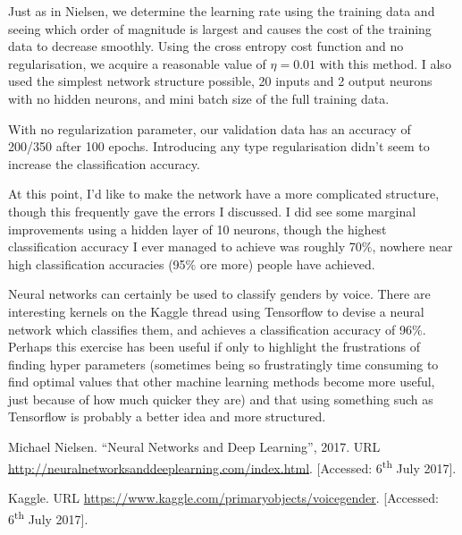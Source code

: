 \documentclass[10pt]{article}
\begin{document}
Just as in Nielsen, we determine the learning rate using the training data and seeing which order of magnitude is largest and causes the cost of the training data to decrease smoothly. Using the cross entropy cost function and no regularisation, we acquire a reasonable value of $\eta = 0.01$ with this method. I also used the simplest network structure possible, 20 inputs and 2 output neurons with no hidden neurons, and mini batch size of the full training data. \par
With no regularization parameter, our validation data has an accuracy of 200/350 after 100 epochs. Introducing any type regularisation didn't seem to increase the classification accuracy. \par
At this point, I'd like to make the network have a more complicated structure, though this frequently gave the errors I discussed. I did see some marginal improvements using a hidden layer of 10 neurons, though the highest classification accuracy I ever managed to achieve was roughly 70$\%$, nowhere near high  classification accuracies (95$\%$ ore more) people have achieved. \par
Neural networks can certainly be used to classify genders by voice. There are interesting kernels on the Kaggle thread using Tensorflow to devise a neural network which classifies them, and achieves a classification accuracy of 96$\%$. Perhaps this exercise has been useful if only to highlight the frustrations of finding hyper parameters (sometimes being so frustratingly time consuming to find optimal values that other machine learning methods become more useful, just because of how much quicker they are) and that using something such as Tensorflow is probably a better idea and more structured.

\begin{thebibliography}{9}
	Michael Nielsen.
	``Neural Networks and Deep Learning'',
	2017.
	URL \url{http://neuralnetworksanddeeplearning.com/index.html}.
	[Accessed: 6\textsuperscript{th} July 2017].
	
	Kaggle.
	URL \url{https://www.kaggle.com/primaryobjects/voicegender}.
	[Accessed: 6\textsuperscript{th} July 2017].
\end{thebibliography}
\end{document}
